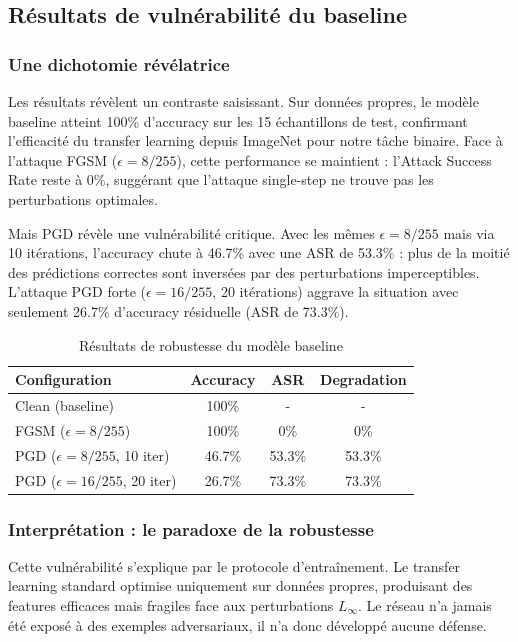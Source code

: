 \subsection{Résultats de vulnérabilité du baseline}

\subsubsection{Une dichotomie révélatrice}

Les résultats révèlent un contraste saisissant. Sur données propres, le modèle baseline atteint 100\% d'accuracy sur les 15 échantillons de test, confirmant l'efficacité du transfer learning depuis ImageNet pour notre tâche binaire. Face à l'attaque FGSM ($\epsilon=8/255$), cette performance se maintient : l'Attack Success Rate reste à 0\%, suggérant que l'attaque single-step ne trouve pas les perturbations optimales.

Mais PGD révèle une vulnérabilité critique. Avec les mêmes $\epsilon=8/255$ mais via 10 itérations, l'accuracy chute à 46.7\% avec une ASR de 53.3\% : plus de la moitié des prédictions correctes sont inversées par des perturbations imperceptibles. L'attaque PGD forte ($\epsilon=16/255$, 20 itérations) aggrave la situation avec seulement 26.7\% d'accuracy résiduelle (ASR de 73.3\%).

\begin{table}[h]
\centering
\caption{Résultats de robustesse du modèle baseline}
\begin{tabular}{lccc}
\hline
\textbf{Configuration} & \textbf{Accuracy} & \textbf{ASR} & \textbf{Degradation} \\
\hline
Clean (baseline) & 100\% & - & - \\
FGSM ($\epsilon=8/255$) & 100\% & 0\% & 0\% \\
PGD ($\epsilon=8/255$, 10 iter) & 46.7\% & 53.3\% & 53.3\% \\
PGD ($\epsilon=16/255$, 20 iter) & 26.7\% & 73.3\% & 73.3\% \\
\hline
\end{tabular}
\label{tab:baseline_results}
\end{table}

\subsubsection{Interprétation : le paradoxe de la robustesse}

Cette vulnérabilité s'explique par le protocole d'entraînement. Le transfer learning standard optimise uniquement sur données propres, produisant des features efficaces mais fragiles face aux perturbations $L_\infty$. Le réseau n'a jamais été exposé à des exemples adversariaux, il n'a donc développé aucune défense.

